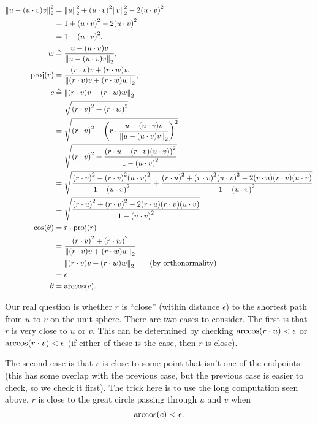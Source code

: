 \begin{align*}
	\norm{u - \pof{u \cdot v}v}_2^2 &= \norm{u}_2^2 + \pof{u \cdot v}^2\norm{v}_2^2 - 2\pof{u \cdot v}^2 \\
		&= 1 + \pof{u \cdot v}^2 - 2\pof{u \cdot v}^2 \\
		&= 1 - \pof{u \cdot v}^2, \\
	w &\triangleq \frac{u - \pof{u \cdot v}v}{\norm{u - \pof{u \cdot v}v}_2}, \\
	\proj\pof{r} &= \frac{\pof{r \cdot v}v + \pof{r \cdot w}w}{\norm{\pof{r \cdot v}v + \pof{r \cdot w}w}_2}, \\
	c &\triangleq \norm{\pof{r \cdot v}v + \pof{r \cdot w}w}_2 \\
		&= \sqrt{\pof{r \cdot v}^2 + \pof{r \cdot w}^2} \\
		&= \sqrt{\pof{r \cdot v}^2 + \pof{r \cdot \frac{u - \pof{u \cdot v}v}{\norm{u - \pof{u \cdot v}v}_2}}^2} \\
		&= \sqrt{\pof{r \cdot v}^2 + \frac{\pof{r \cdot u - \pof{r \cdot v}\pof{u \cdot v}}^2}{1 - \pof{u \cdot v}^2}} \\
		&= \sqrt{\frac{\pof{r \cdot v}^2 - \pof{r \cdot v}^2\pof{u \cdot v}^2}{1 - \pof{u \cdot v}^2} + \frac{\pof{r \cdot u}^2 + \pof{r \cdot v}^2\pof{u \cdot v}^2 - 2\pof{r \cdot u}\pof{r \cdot v}\pof{u \cdot v}}{1 - \pof{u \cdot v}^2}} \\
		&= \sqrt{\frac{\pof{r \cdot u}^2 + \pof{r \cdot v}^2 - 2\pof{r \cdot u}\pof{r \cdot v}\pof{u \cdot v}}{1 - \pof{u \cdot v}^2}} \\
	 \cos\pof{\theta} &= r \cdot \proj\pof{r} \\
		&= \frac{\pof{r \cdot v}^2 + \pof{r \cdot w}^2}{\norm{\pof{r \cdot v}v + \pof{r \cdot w}w}_2} \\
		&= \norm{\pof{r \cdot v}v + \pof{r \cdot w}w}_2 \qquad \text{(by orthonormality)} \\
		&= c \\
	\theta &= \arccos\pof{c}.
\end{align*}

Our real question is whether \(r\) is ``close'' (within distance \(\epsilon\)) to the shortest path from \(u\) to \(v\) on the unit sphere. There are two cases to consider. The first is that \(r\) is very close to \(u\) or \(v\). This can be determined by checking \(\arccos\pof{r \cdot u} < \epsilon\) or \(\arccos\pof{r \cdot v} < \epsilon\) (if either of these is the case, then \(r\) is close).

The second case is that \(r\) is close to some point that isn't one of the endpoints (this has some overlap with the previous case, but the previous case is easier to check, so we check it first). The trick here is to use the long computation seen above. \(r\) is close to the great circle passing through \(u\) and \(v\) when \[\arccos\pof{c} < \epsilon.\]


